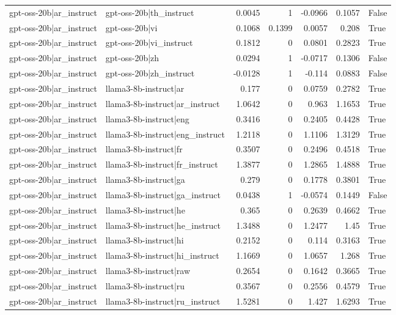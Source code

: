 \begin{table}
\begin{tabular}{l l r r r r l}
gpt-oss-20b|ar_instruct & gpt-oss-20b|th_instruct & 0.0045 & 1 & -0.0966 & 0.1057 & False \\
gpt-oss-20b|ar_instruct & gpt-oss-20b|vi & 0.1068 & 0.1399 & 0.0057 & 0.208 & True \\
gpt-oss-20b|ar_instruct & gpt-oss-20b|vi_instruct & 0.1812 & 0 & 0.0801 & 0.2823 & True \\
gpt-oss-20b|ar_instruct & gpt-oss-20b|zh & 0.0294 & 1 & -0.0717 & 0.1306 & False \\
gpt-oss-20b|ar_instruct & gpt-oss-20b|zh_instruct & -0.0128 & 1 & -0.114 & 0.0883 & False \\
gpt-oss-20b|ar_instruct & llama3-8b-instruct|ar & 0.177 & 0 & 0.0759 & 0.2782 & True \\
gpt-oss-20b|ar_instruct & llama3-8b-instruct|ar_instruct & 1.0642 & 0 & 0.963 & 1.1653 & True \\
gpt-oss-20b|ar_instruct & llama3-8b-instruct|eng & 0.3416 & 0 & 0.2405 & 0.4428 & True \\
gpt-oss-20b|ar_instruct & llama3-8b-instruct|eng_instruct & 1.2118 & 0 & 1.1106 & 1.3129 & True \\
gpt-oss-20b|ar_instruct & llama3-8b-instruct|fr & 0.3507 & 0 & 0.2496 & 0.4518 & True \\
gpt-oss-20b|ar_instruct & llama3-8b-instruct|fr_instruct & 1.3877 & 0 & 1.2865 & 1.4888 & True \\
gpt-oss-20b|ar_instruct & llama3-8b-instruct|ga & 0.279 & 0 & 0.1778 & 0.3801 & True \\
gpt-oss-20b|ar_instruct & llama3-8b-instruct|ga_instruct & 0.0438 & 1 & -0.0574 & 0.1449 & False \\
gpt-oss-20b|ar_instruct & llama3-8b-instruct|he & 0.365 & 0 & 0.2639 & 0.4662 & True \\
gpt-oss-20b|ar_instruct & llama3-8b-instruct|he_instruct & 1.3488 & 0 & 1.2477 & 1.45 & True \\
gpt-oss-20b|ar_instruct & llama3-8b-instruct|hi & 0.2152 & 0 & 0.114 & 0.3163 & True \\
gpt-oss-20b|ar_instruct & llama3-8b-instruct|hi_instruct & 1.1669 & 0 & 1.0657 & 1.268 & True \\
gpt-oss-20b|ar_instruct & llama3-8b-instruct|raw & 0.2654 & 0 & 0.1642 & 0.3665 & True \\
gpt-oss-20b|ar_instruct & llama3-8b-instruct|ru & 0.3567 & 0 & 0.2556 & 0.4579 & True \\
gpt-oss-20b|ar_instruct & llama3-8b-instruct|ru_instruct & 1.5281 & 0 & 1.427 & 1.6293 & True \\

\end{tabular}
\end{table}
